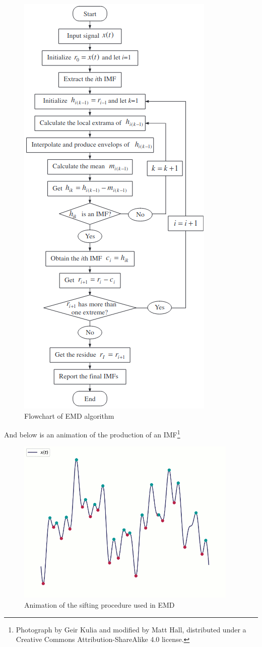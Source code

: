 \documentclass[
  english,
  paper=a4,
  oneside  ,captions=tableheading
]{scrbook}
\begin{document}
\begin{figure}
\centering
\includegraphics{img/emd_flowchart.png}
\caption{Flowchart of EMD algorithm}
\end{figure}

And below is an animation of the production of an IMF\footnote{Photograph
  by Geir Kulia and modified by Matt Hall, distributed under a Creative
  Commons Attribution-ShareAlike 4.0 license.}

\begin{figure}
\centering
\includegraphics{img/Emd_example_lowres.gif}
\caption{Animation of the sifting procedure used in EMD}
\end{figure}
\end{document}

